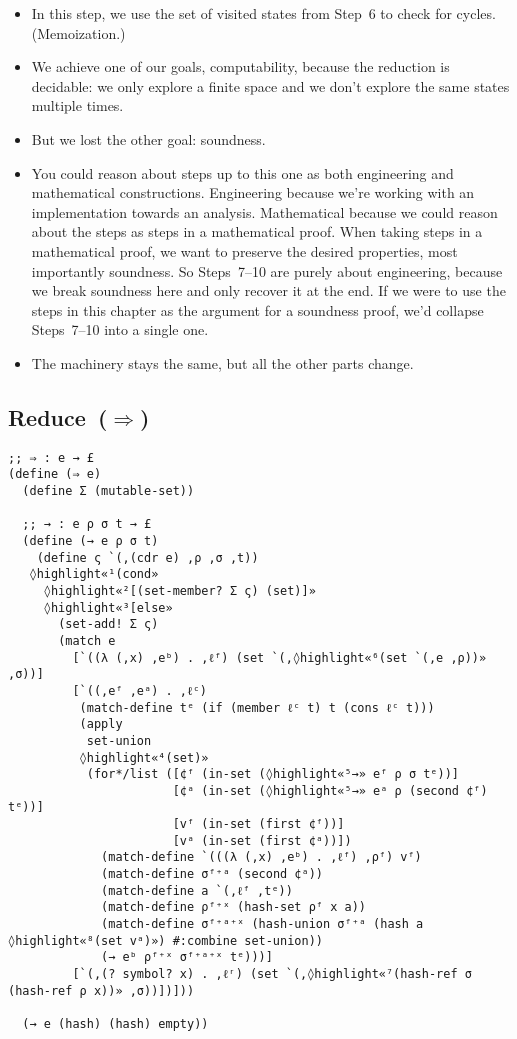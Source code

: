 \documentclass[12pt, oneside]{book}
\begin{document}
\begin{itemize}
  \item In this step, we use the set of visited states from Step~6 to check for cycles. (Memoization.)
  \item We achieve one of our goals, computability, because the reduction is decidable: we only explore a finite space and we don’t explore the same states multiple times.
  \item But we lost the other goal: soundness.
  \item You could reason about steps up to this one as both engineering and mathematical constructions. Engineering because we’re working with an implementation towards an analysis. Mathematical because we could reason about the steps as steps in a mathematical proof. When taking steps in a mathematical proof, we want to preserve the desired properties, most importantly soundness. So Steps~7–10 are purely about engineering, because we break soundness here and only recover it at the end. If we were to use the steps in this chapter as the argument for a soundness proof, we’d collapse Steps~7–10 into a single one.
  \item The machinery stays the same, but all the other parts change.
\end{itemize}

\subsection{Reduce~(\(⇒\))}

\begin{Verbatim}
;; ⇒ : e → £
(define (⇒ e)
  (define Σ (mutable-set))

  ;; → : e ρ σ t → £
  (define (→ e ρ σ t)
    (define ς `(,(cdr e) ,ρ ,σ ,t))
   ◊highlight«¹(cond»
     ◊highlight«²[(set-member? Σ ς) (set)]»
     ◊highlight«³[else»
       (set-add! Σ ς)
       (match e
         [`((λ (,x) ,eᵇ) . ,ℓᶠ) (set `(,◊highlight«⁶(set `(,e ,ρ))» ,σ))]
         [`((,eᶠ ,eᵃ) . ,ℓᶜ)
          (match-define tᵉ (if (member ℓᶜ t) t (cons ℓᶜ t)))
          (apply
           set-union
          ◊highlight«⁴(set)»
           (for*/list ([¢ᶠ (in-set (◊highlight«⁵→» eᶠ ρ σ tᵉ))]
                       [¢ᵃ (in-set (◊highlight«⁵→» eᵃ ρ (second ¢ᶠ) tᵉ))]
                       [vᶠ (in-set (first ¢ᶠ))]
                       [vᵃ (in-set (first ¢ᵃ))])
             (match-define `(((λ (,x) ,eᵇ) . ,ℓᶠ) ,ρᶠ) vᶠ)
             (match-define σᶠ⁺ᵃ (second ¢ᵃ))
             (match-define a `(,ℓᶠ ,tᵉ))
             (match-define ρᶠ⁺ˣ (hash-set ρᶠ x a))
             (match-define σᶠ⁺ᵃ⁺ˣ (hash-union σᶠ⁺ᵃ (hash a ◊highlight«⁸(set vᵃ)») #:combine set-union))
             (→ eᵇ ρᶠ⁺ˣ σᶠ⁺ᵃ⁺ˣ tᵉ)))]
         [`(,(? symbol? x) . ,ℓʳ) (set `(,◊highlight«⁷(hash-ref σ (hash-ref ρ x))» ,σ))])]))

  (→ e (hash) (hash) empty))
\end{Verbatim}
\end{document}

